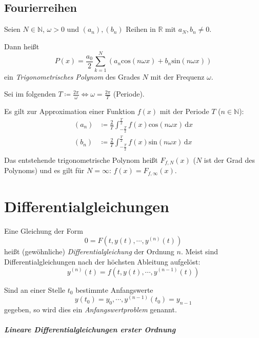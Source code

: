 \documentclass[a4paper, 11pt, accentcolor = tud3b]{tudreport}
\begin{document}
        \section{Fourierreihen}
            Seien $ N \in \mathbb{N} $, $ \omega > 0 $ und $ (a _ n), (b _ n) $ Reihen in $ \mathbb{R} $ mit $ a _ N, b _ n \neq 0 $.

            Dann heißt \[ P(x) = \frac{a _ 0}{2} \sum _ { k = 1 } ^ N (a _ n \text{cos}(n \omega x) + b _ n \text{sin}(n \omega x)) \] ein \textit{Trigonometrisches Polynom} des Grades $ N $ mit der Frequenz $ \omega $.

            Sei im folgenden $ T \coloneqq \frac{2\pi}{\omega} \iff \omega = \frac{2\pi}{T} $ (Periode).

            Es gilt zur Approximation einer Funktion $ f(x) $ mit der Periode $ T $ ($ n \in \mathbb{N} $):
            \begin{align*}
                (a _ n) &\coloneqq \frac{2}{T} \int _ { - \frac{T}{2} } ^ \frac{T}{2} \! f(x) \text{cos}(n \omega x) \, \mathrm{d}x \\
                (b _ n) &\coloneqq \frac{2}{T} \int _ { - \frac{T}{2} } ^ \frac{T}{2} \! f(x) \text{sin}(n \omega x) \, \mathrm{d}x \\
            \end{align*}
            Das entstehende trigonometrische Polynom heißt $ F _ { f, N } (x) $ ($ N $ ist der Grad des Polynoms) und es gilt für $ N = \infty $: $ f(x) = F _ { f, \infty } (x) $.

    \chapter{Differentialgleichungen}
        Eine Gleichung der Form \[ 0 = F(t, y(t), \cdots, y ^ {(n)}(t)) \] heißt (gewöhnliche) \textit{Differentialgleichung} der Ordnung $ n $. Meist sind Differentialgleichungen nach der höchsten Ableitung aufgelöst: \[ y ^ {(n)} (t) = f(t, y(t), \cdots, y ^ {(n - 1)} (t)) \]

        Sind an einer Stelle $ t _ 0 $ bestimmte Anfangswerte \[ y(t _ 0) = y _ 0, \cdots, y ^ {(n - 1)} (t _ 0) = y _ { n - 1 } \] gegeben, so wird dies ein \textit{Anfangswertproblem} genannt.

        \paragraph{Lineare Differentialgleichungen erster Ordnung}
            \label{p:dgl_linear}
\end{document}
